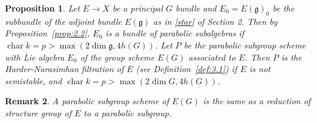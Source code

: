 \documentclass[12pt]{article}
\newtheorem{proposition}{Proposition}[section]
\newtheorem{remark}[proposition]{Remark}
\begin{document}
\begin{proposition}\label{prop:3.4}
Let $E \to X$ be a principal $G$ bundle and $E_0 = E(\mathfrak{g})_0$ be the subbundle of the adjoint bundle $E(\mathfrak{g})$ as in \eqref{star} of Section 2. Then by Proposition~\ref{prop:2.2}, $E_0$ is a bundle of parabolic subalgebras if $\operatorname{char} k = p > \max(2 \dim \mathfrak{g}, 4h(G))$. Let $P$ be the parabolic subgroup scheme with Lie algebra $E_0$ of the group scheme $E(G)$ associated to $E$. Then $P$ is the Harder-Narasimhan filtration of $E$ (see Definition~\ref{def:3.1}) if $E$ is not semistable, and $\operatorname{char} k = p > \max(2 \dim G, 4h(G))$.
\end{proposition}

\begin{remark}\label{rem:3.5}
A parabolic subgroup scheme of $E(G)$ is the same as a reduction of structure group of $E$ to a parabolic subgroup.
\end{remark}
\end{document}

